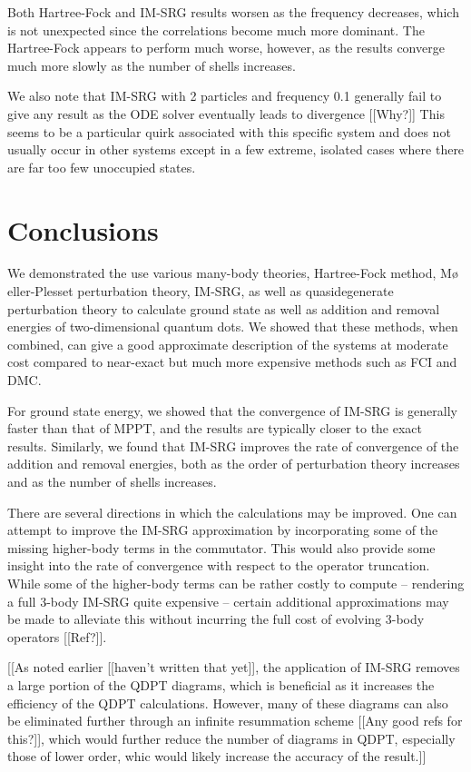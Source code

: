 \documentclass[amsmath, amssymb, aps, floatfix, nofootinbib, preprintnumbers,showpacs, superscriptaddress, twocolumn]{revtex4-1}
\begin{document}
Both Hartree-Fock and IM-SRG results worsen as the frequency decreases, which
is not unexpected since the correlations become much more dominant.  The
Hartree-Fock appears to perform much worse, however, as the results converge
much more slowly as the number of shells increases.

We also note that IM-SRG with 2 particles and frequency 0.1 generally fail to
give any result as the ODE solver eventually leads to divergence [[Why?]]
This seems to be a particular quirk associated with this specific system and
does not usually occur in other systems except in a few extreme, isolated
cases where there are far too few unoccupied states.

\section{Conclusions}
\label{sec:conclusions}

We demonstrated the use various many-body theories, Hartree-Fock method, M\o
eller-Plesset perturbation theory, IM-SRG, as well as quasidegenerate
perturbation theory to calculate ground state as well as addition and removal
energies of two-dimensional quantum dots.  We showed that these methods, when
combined, can give a good approximate description of the systems at moderate
cost compared to near-exact but much more expensive methods such as FCI and
DMC.

For ground state energy, we showed that the convergence of IM-SRG is generally
faster than that of MPPT, and the results are typically closer to the exact
results.  Similarly, we found that IM-SRG improves the rate of convergence of
the addition and removal energies, both as the order of perturbation theory
increases and as the number of shells increases.

There are several directions in which the calculations may be improved.  One
can attempt to improve the IM-SRG approximation by incorporating some of the
missing higher-body terms in the commutator.  This would also provide some
insight into the rate of convergence with respect to the operator truncation.
While some of the higher-body terms can be rather costly to compute --
rendering a full 3-body IM-SRG quite expensive -- certain additional
approximations may be made to alleviate this without incurring the full cost
of evolving 3-body operators [[Ref?]].

[[As noted earlier [[haven't written that yet]], the application of IM-SRG
removes a large portion of the QDPT diagrams, which is beneficial as it
increases the efficiency of the QDPT calculations.  However, many of these
diagrams can also be eliminated further through an infinite resummation scheme
[[Any good refs for this?]], which would further reduce the number of diagrams
in QDPT, especially those of lower order, whic would likely increase the
accuracy of the result.]]
\end{document}

